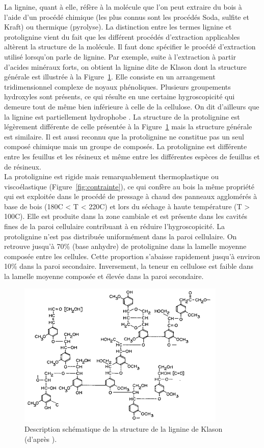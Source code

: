 La lignine, quant à elle, réfère à la molécule que l'on peut extraire du bois à l'aide d'un procédé chimique (les plus connus sont les procédés Soda, sulfite et Kraft) ou thermique (pyrolyse). La distinction entre les termes lignine et protolignine vient du fait que les différent procédés d'extraction applicables altèrent la structure de la molécule. Il faut donc spécifier le procédé d'extraction utilisé lorsqu'on parle de lignine. Par exemple, suite à l'extraction à partir d'acides minéraux forts, on obtient la lignine dite \og de Klason \fg dont la structure générale est illustrée à la Figure~\ref{fig:lignine}. Elle consiste en un arrangement tridimensionnel complexe de noyaux phénoliques. Plusieurs groupements hydroxyles sont présents, ce qui résulte en une certaine hygroscopicité qui demeure tout de même bien inférieure à celle de la cellulose. On dit d'ailleurs que la lignine est \og partiellement hydrophobe \fg. La structure de la protolignine est légèrement différente de celle présentée à la Figure~\ref{fig:lignine} mais la structure générale est similaire. Il est aussi reconnu que la protolignine ne constitue pas un seul composé chimique mais un groupe de composés. La protolignine est différente entre les feuillus et les résineux et même entre les différentes espèces de feuillus et de résineux.\\

La protolignine est rigide mais remarquablement thermoplastique ou viscoélastique (Figure~\ref{fig:contrainte}), ce qui confère au bois la même propriété qui est exploitée dans le procédé de pressage à chaud des panneaux agglomérés à base de bois (180\textdegree C < T < 220\textdegree C) et lors du séchage à haute température (T > 100\textdegree C). Elle est produite dans la zone cambiale et est présente dans les cavités fines de la paroi cellulaire contribuant à en réduire l'hygroscopicité. La protolignine n'est pas distribuée uniformément dans la paroi cellulaire. On retrouve jusqu'à 70\% (base anhydre) de protolignine dans la lamelle moyenne composée entre les cellules. Cette proportion s'abaisse rapidement jusqu'à environ 10\% dans la paroi secondaire. Inversement, la teneur en cellulose est faible dans la lamelle moyenne composée et élevée dans la paroi secondaire.

\begin{figure}[h]
\centering
\includegraphics[scale=0.8]{img/ch6_lignine}
\caption{Description schématique de la structure de la lignine de Klason (d'après \cite{choong1997wood}).}
\label{fig:lignine}
\end{figure}

